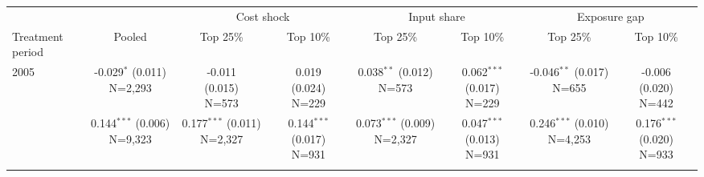 \begin{tabular}{lccccccc}
\toprule
 & & \multicolumn{2}{c}{Cost shock} & \multicolumn{2}{c}{Input share} & \multicolumn{2}{c}{Exposure gap} \\
\cmidrule(lr){3-4}\cmidrule(lr){5-6}\cmidrule(lr){7-8}
Treatment period & Pooled & Top 25\% & Top 10\% & Top 25\% & Top 10\% & Top 25\% & Top 10\% \\
\midrule
2005 & \makecell{-0.029$^{*}$ \\ \footnotesize{(0.011)} \\ \footnotesize{N=2,293}} & \makecell{-0.011 \\ \footnotesize{(0.015)} \\ \footnotesize{N=573}} & \makecell{0.019 \\ \footnotesize{(0.024)} \\ \footnotesize{N=229}} & \makecell{0.038$^{**}$ \\ \footnotesize{(0.012)} \\ \footnotesize{N=573}} & \makecell{0.062$^{***}$ \\ \footnotesize{(0.017)} \\ \footnotesize{N=229}} & \makecell{-0.046$^{**}$ \\ \footnotesize{(0.017)} \\ \footnotesize{N=655}} & \makecell{-0.006 \\ \footnotesize{(0.020)} \\ \footnotesize{N=442}} \\\addlinespace
2017 & \makecell{0.144$^{***}$ \\ \footnotesize{(0.006)} \\ \footnotesize{N=9,323}} & \makecell{0.177$^{***}$ \\ \footnotesize{(0.011)} \\ \footnotesize{N=2,327}} & \makecell{0.144$^{***}$ \\ \footnotesize{(0.017)} \\ \footnotesize{N=931}} & \makecell{0.073$^{***}$ \\ \footnotesize{(0.009)} \\ \footnotesize{N=2,327}} & \makecell{0.047$^{***}$ \\ \footnotesize{(0.013)} \\ \footnotesize{N=931}} & \makecell{0.246$^{***}$ \\ \footnotesize{(0.010)} \\ \footnotesize{N=4,253}} & \makecell{0.176$^{***}$ \\ \footnotesize{(0.020)} \\ \footnotesize{N=933}} \\\addlinespace
\bottomrule
\end{tabular}
